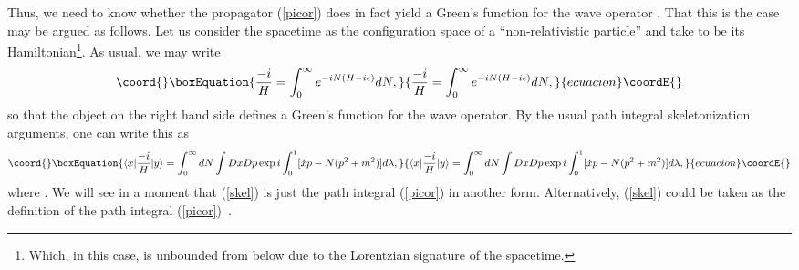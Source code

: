 \documentclass[a4paper,12pt]{article}
\begin{document}
Thus, we need to know whether the propagator (\ref{picor}) does in
fact yield a Green's function for the wave operator \coordHE{}.  That
this is the case may be argued as follows.  Let us consider the
spacetime as the configuration space of a ``non-relativistic
particle'' and take \coordHE{} to be its
Hamiltonian\footnote{Which, in this case, is unbounded from below due
  to the Lorentzian signature of the spacetime.}.  As usual, we may
write
\begin{equation}\coord{}\boxEquation{
\frac{-i}{H} = \int_0^\infty e^{- iN(H - i \epsilon)} dN,
}{
\frac{-i}{H} = \int_0^\infty e^{- iN(H - i \epsilon)} dN,
}{ecuacion}\coordE{}\end{equation}
so that the object on the right hand side defines a
Green's function for the wave operator.  By the usual path
integral skeletonization
arguments, one can write this as
\begin{equation}\coord{}\boxEquation{ 
\label{skel}
\langle x| \frac{-i}{H}| y \rangle = \int_0^\infty  dN
\int Dx Dp \exp{i \int_0^1 [\dot{x}p - N(p^2 + m^2)]d\lambda}, 
}{ 
\langle x| \frac{-i}{H}| y \rangle = \int_0^\infty  dN
\int Dx Dp \exp{i \int_0^1 [\dot{x}p - N(p^2 + m^2)]d\lambda}, 
}{ecuacion}\coordE{}\end{equation}
where \coordHE{}.  We will see in a moment that
(\ref{skel}) is just the path integral (\ref{picor}) in another
form. Alternatively, (\ref{skel}) could be taken as the definition of
the path integral (\ref{picor})~\cite{teitel-pi1,henn-teitel,piINST}.
\end{document}
